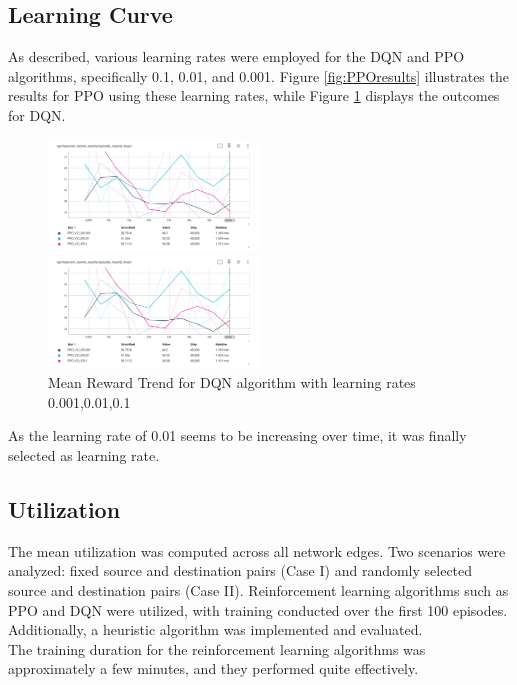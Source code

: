 \documentclass[conference]{IEEEtran}
\begin{document}
\subsection{Learning Curve}

As described, various learning rates were employed for the DQN and PPO algorithms, specifically 0.1, 0.01, and 0.001. Figure \ref{fig:PPOresults} illustrates the results for PPO using these learning rates, while Figure \ref{fig:DQNresults} displays the outcomes for DQN.
\begin{figure}[ht]
  \centering
   \includegraphics[width=0.5\textwidth]{PPO.png}
  \caption{Mean Reward Trend for PPO algorithm with learning rates 0.001,0.01,0.1}
  \label{fig:PPOresults}



  \centering
   \includegraphics[width=0.5\textwidth]{PPO.png}
  \caption{Mean Reward Trend for DQN algorithm with learning rates 0.001,0.01,0.1}
  \label{fig:DQNresults}
\end{figure}

As the learning rate of 0.01 seems to be increasing over time, it was finally selected as learning rate.


\subsection{Utilization}

The mean utilization was computed across all network edges. Two scenarios were analyzed: fixed source and destination pairs (Case I) and randomly selected source and destination pairs (Case II). Reinforcement learning algorithms such as PPO and DQN were utilized, with training conducted over the first 100 episodes. Additionally, a heuristic algorithm was implemented and evaluated. \\
The training duration for the reinforcement learning algorithms was approximately a few minutes, and they performed quite effectively.
\end{document}
